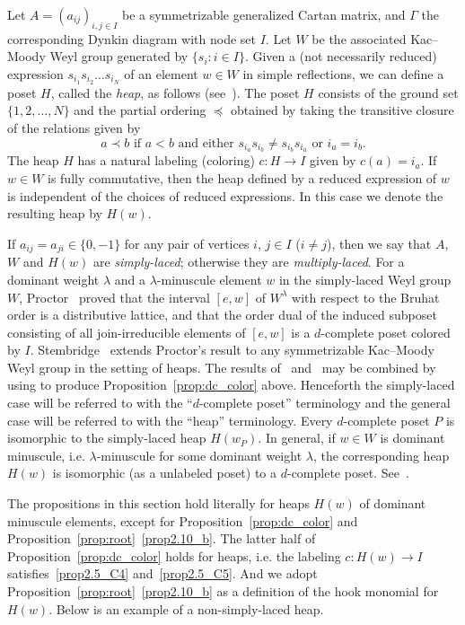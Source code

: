 \begin{rema}
\label{rem:heap1}
Let $A = (a_{ij})_{i,j \in I}$ be a symmetrizable generalized Cartan matrix, 
and $\Gamma$ the corresponding Dynkin diagram with node set $I$.
Let $W$ be the associated Kac--Moody Weyl group generated by $\{ s_i : i \in I \}$.
Given a (not necessarily reduced) expression $s_{i_1} s_{i_2} \dots s_{i_N}$ of an element $w \in W$ 
in simple reflections, we can define a poset $H$, called the \emph{heap}, as follows 
(see~\cite{Stem1}).
The poset $H$ consists of the ground set $\{ 1, 2, \dots, N \}$ and the partial ordering 
$\preceq$ obtained by taking the transitive closure of the relations given by
$$
\text{$a \prec b$ if $a < b$ and either $s_{i_a} s_{i_b} \neq s_{i_b} s_{i_a}$ or $i_a = i_b$.}
$$
The heap $H$ has a natural labeling (coloring) $c: H \to I$ given by $c(a) = i_a$.
If $w \in W$ is fully commutative, then the heap defined by a reduced expression of $w$ 
is independent of the choices of reduced expressions.
In this case we denote the resulting heap by $H(w)$.

If $a_{ij} = a_{ji} \in \{ 0, -1 \}$ for any pair of vertices $i$, $j \in I$ ($i \neq j$), 
then we say that $A$, $W$ and $H(w)$ are \emph{simply-laced}; 
otherwise they are \emph{multiply-laced}.
For a dominant weight $\lambda$ and a $\lambda$-minuscule element $w$ in the simply-laced Weyl group $W$,
Proctor~\cite{Proc2} proved that the interval $[e,w]$ of $W^\lambda$ with respect to 
the Bruhat order is a distributive lattice, 
and that the order dual of the induced subposet consisting of all join-irreducible elements of $[e,w]$ 
is a $d$-complete poset colored by $I$.
Stembridge~\cite{Stem2} extends Proctor's result to any symmetrizable Kac--Moody Weyl group 
in the setting of heaps.
The results of~\cite{Proc2} and~\cite{Stem2} may be combined by using 
\cite[Theorem~3.2~(c)]{Stem1} to produce Proposition~\ref{prop:dc_color} above.
Henceforth the simply-laced case will be referred to with the ``$d$-complete poset'' terminology 
and the general case will be referred to with the ``heap'' terminology.
Every $d$-complete poset $P$ is isomorphic to the simply-laced heap $H(w_P)$. 
In general, if $w \in W$ is dominant minuscule, i.e. $\lambda$-minuscule for some dominant weight $\lambda$, 
the corresponding heap $H(w)$ is isomorphic (as a unlabeled poset) to a $d$-complete poset.
See~\cite[Sections~3 and~4]{Stem2}.

The propositions in this section hold literally for heaps $H(w)$ of dominant minuscule elements, 
except for Proposition~\ref{prop:dc_color} and Proposition~\ref{prop:root}~\ref{prop2.10_b}.
The latter half of Proposition~\ref{prop:dc_color} holds for heaps, 
i.e. the labeling $c : H(w) \to I$ satisfies~\ref{prop2.5_C4} and~\ref{prop2.5_C5}.
And we adopt Proposition~\ref{prop:root}~\ref{prop2.10_b} as a definition of the hook monomial for $H(w)$.
Below is an example of a non-simply-laced heap.
\end{rema}

